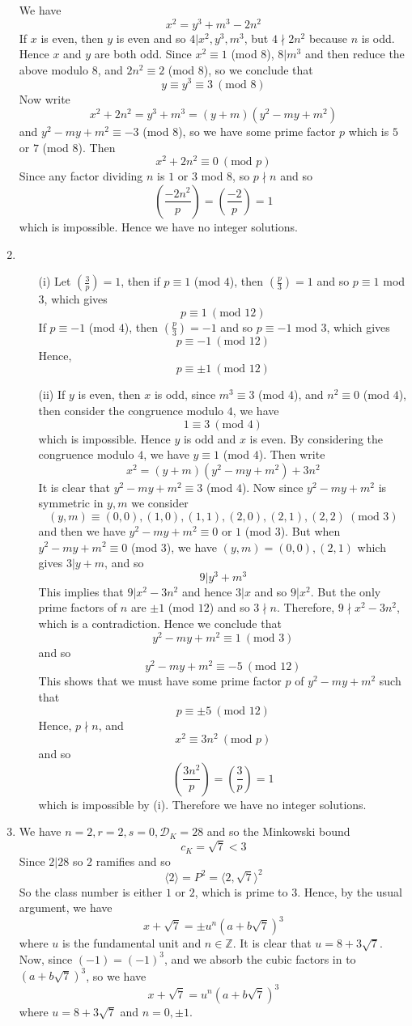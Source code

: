 \begin{enumerate}
We have
$$x^2=y^3+m^3-2n^2$$
If $x$ is even, then $y$ is even and so $4|x^2,y^3,m^3$, but $4 \nmid 2n^2$ because $n$ is odd.
Hence $x$ and $y$ are both odd. Since $x^2 \equiv 1$ (mod $8$), $8|m^3$ and then reduce the above modulo $8$,
and $2n^2 \equiv 2$ (mod $8$), so we conclude that
$$y \equiv y^3 \equiv 3~(\text{mod } 8)$$
Now write
$$x^2+2n^2=y^3+m^3=(y+m)(y^2-my+m^2)$$
and $y^2-my+m^2 \equiv -3$ (mod $8$), so we have some prime factor $p$ which is $5$ or $7$ (mod $8$). Then
$$x^2+2n^2 \equiv 0~(\text{mod } p)$$
Since any factor dividing $n$ is $1$ or $3$ mod $8$, so $p \nmid n$ and so
$$\left(\frac{-2n^2}{p}\right)=\left(\frac{-2}{p}\right)=1$$
which is impossible. Hence we have no integer solutions.
\item \begin{enumerate}
\item[(i)] Let $(\frac{3}{p})=1$, then if $p \equiv 1$ (mod $4$), then
$(\frac{p}{3})=1$ and so $p \equiv 1$ mod $3$, which gives
$$p \equiv 1~(\text{mod } 12)$$
If $p \equiv -1$ (mod $4$), then
$(\frac{p}{3})=-1$ and so $p \equiv -1$ mod $3$, which gives
$$p \equiv -1~(\text{mod } 12)$$
Hence,
$$p \equiv \pm 1~(\text{mod }12)$$
\item[(ii)] If $y$ is even, then $x$ is odd, since $m^3 \equiv 3$ (mod $4$), and $n^2 \equiv 0$ (mod $4$), then
consider the congruence modulo $4$, we have
$$1 \equiv 3~(\text{mod } 4)$$
which is impossible. Hence $y$ is odd and $x$ is even. By considering the congruence modulo $4$, we have
$y \equiv 1$ (mod $4$). Then write
$$x^2=(y+m)(y^2-my+m^2)+3n^2$$
It is clear that $y^2-my+m^2 \equiv 3$ (mod $4$). Now since $y^2-my+m^2$ is symmetric in $y,m$ we consider
$$(y,m) \equiv (0,0),(1,0),(1,1),(2,0),(2,1),(2,2)~(\text{mod } 3)$$
and then we have $y^2-my+m^2 \equiv 0$ or $1$ (mod $3$). But when $y^2-my+m^2 \equiv 0$ (mod $3$),
we have $(y,m)=(0,0),(2,1)$ which gives $3|y+m$, and so
$$9|y^3+m^3$$
This implies that $9|x^2-3n^2$ and hence $3|x$ and so $9|x^2$. But
the only prime factors of $n$ are $\pm 1$ (mod $12$) and so $3 \nmid n$. Therefore,
$9\nmid x^2-3n^2$, which is a contradiction. Hence we conclude that
$$y^2-my+m^2 \equiv 1~(\text{mod } 3)$$
and so
$$y^2-my+m^2 \equiv -5~(\text{mod }12)$$
This shows that we must have some prime factor $p$ of $y^2-my+m^2$ such that
$$p \equiv \pm 5~(\text{mod }12)$$
Hence, $p \nmid n$, and
$$x^2 \equiv 3n^2~(\text{mod }p)$$
and so
$$\left(\frac{3n^2}{p}\right)=\left(\frac{3}{p}\right)=1$$
which is impossible by (i). Therefore we have no integer solutions.
\end{enumerate}
\item We have $n=2,r=2,s=0,\mathcal{D}_K=28$ and so the Minkowski bound
$$c_K=\sqrt{7}<3$$
Since $2|28$ so $2$ ramifies and so
$$\langle 2 \rangle=P^2=\langle 2,\sqrt{7}\rangle^2$$
So the class number is either $1$ or $2$, which is prime to $3$. Hence, by the usual argument, we have
$$x+\sqrt{7}=\pm u^n(a+b\sqrt{7})^3$$
where $u$ is the fundamental unit and $n \in \mathbb{Z}$. It is clear that $u=8+3\sqrt{7}$. Now, since $(-1)=(-1)^3$, and
we absorb the cubic factors in to $(a+b\sqrt{7})^3$, so we have
$$x+\sqrt{7}=u^n(a+b\sqrt{7})^3$$
where $u=8+3\sqrt{7}$ and $n=0,\pm 1$.


\end{enumerate}
